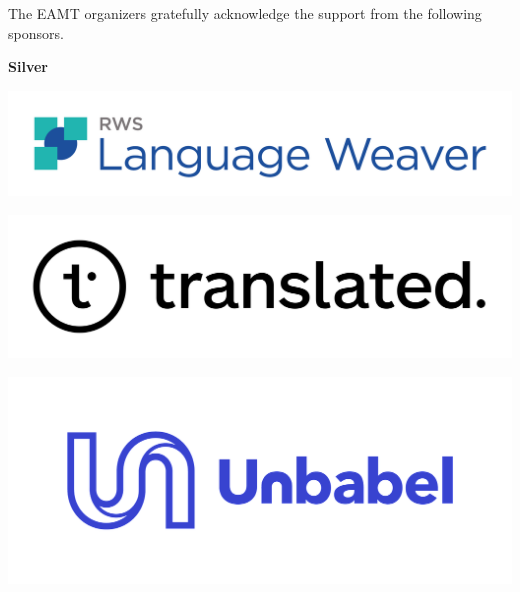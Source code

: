 \documentclass[11pt,oneside]{book}
\begin{document}
\setcounter{page}{653}
{}
\noindent


{\Large The EAMT organizers gratefully acknowledge the support from the following sponsors.}
\bigskip

\vspace*{0.5cm}


    \begin{samepage}
  \noindent
  {\Large \textbf{Silver}}

  \nopagebreak
            \begin{minipage}[c][0.21\linewidth][c]{0.30\linewidth}
        \includegraphics[width=\linewidth]{eamt_volume_1/sponsor_logos/language_weaver.pdf}
      \end{minipage}\hspace{0.05\linewidth}
          \begin{minipage}[c][0.21\linewidth][c]{0.30\linewidth}
        \includegraphics[width=\linewidth]{eamt_volume_1/sponsor_logos/Logo_Translated_Primary.png}
      \end{minipage}\hspace{0.05\linewidth}
          \begin{minipage}[c][0.21\linewidth][c]{0.30\linewidth}
        \includegraphics[width=\linewidth]{eamt_volume_1/sponsor_logos/Unbabel logo.png}
      \end{minipage}\hspace{0.05\linewidth}
    
    \end{samepage}
\end{document}
